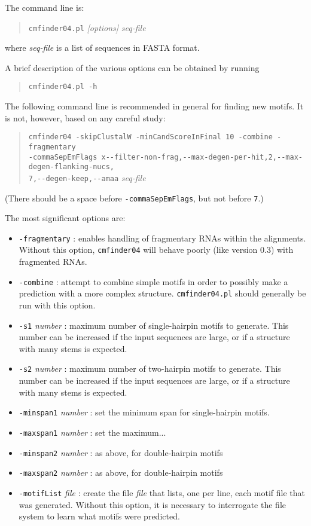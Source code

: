 \documentclass[letterpaper,12pt]{report}
\begin{document}
The command line is:
\begin{quote}
{\tt cmfinder04.pl} {\it [options]} {\it seq-file}
\end{quote}
where {\it seq-file} is a list of sequences in FASTA format.

A brief description of the various options can be obtained by running
\begin{quote}
{\tt cmfinder04.pl -h}
\end{quote}

The following command line is recommended in general for finding new motifs.  It is not, however, based on any careful study:
\begin{quote}
{\tt cmfinder04 -skipClustalW -minCandScoreInFinal 10 -combine -fragmentary\\ -commaSepEmFlags x-{}-filter-non-frag,-{}-max-degen-per-hit,2,-{}-max-degen-flanking-nucs,\\7,-{}-degen-keep,-{}-amaa} {\it seq-file}
\end{quote}
(There should be a space before {\tt -commaSepEmFlags}, but not before {\tt 7}.)

The most significant options are:
\begin{itemize}
\item {\tt -fragmentary} : enables handling of fragmentary RNAs within the alignments.  Without this option, {\tt cmfinder04} will behave poorly (like version 0.3) with fragmented RNAs.
\item {\tt -combine} : attempt to combine simple motifs in order to possibly make a prediction with a more complex structure.  {\tt cmfinder04.pl} should generally be run with this option.
\item {\tt -s1} {\it number} : maximum number of single-hairpin motifs to generate.  This number can be increased if the input sequences are large, or if a structure with many stems is expected.
\item {\tt -s2} {\it number} : maximum number of two-hairpin motifs to generate.  This number can be increased if the input sequences are large, or if a structure with many stems is expected.
\item {\tt -minspan1} {\it number} : set the minimum span for single-hairpin motifs.
\item {\tt -maxspan1} {\it number} : set the maximum...
\item {\tt -minspan2} {\it number} : as above, for double-hairpin motifs
\item {\tt -maxspan2} {\it number} : as above, for double-hairpin motifs
\item {\tt -motifList} {\it file} : create the file {\it file} that lists, one per line, each motif file that was generated.  Without this option, it is necessary to interrogate the file system to learn what motifs were predicted.
\end{itemize}
\end{document}
